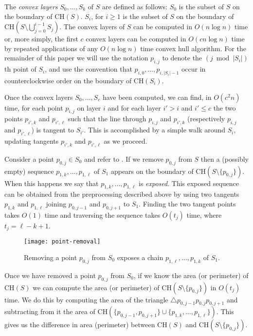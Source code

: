 \documentclass[lotsofwhite]{patmorin}
\newcommand{\ch}{\mathrm{CH}}
\begin{document}
The \emph{convex layers} $S_0,\ldots,S_k$ of $S$ are defined as
follows: $S_0$ is the subset of $S$ on the boundary of $\ch(S)$.
$S_i$, for $i\ge 1$ is the subset of $S$ on the boundary of
$\ch(S\setminus\bigcup_{j=0}^{i-1} S_j)$.  The convex layers of $S$
can be computed in $O(n\log n)$ time \cite{c85,hs92} or, more simply,
the first $c$ convex layers can be computed in $O(cn\log n)$ time by
repeated applications of any $O(n\log n)$ time convex hull algorithm.
For the remainder of this paper we will use the notation $p_{i,j}$ to
denote the $(j\bmod |S_i|)$th point of $S_i$, and use the convention
that $p_{i,0},\ldots,p_{i,|S_i|-1}$ occur in counterclockwise order on
the boundary of $\ch(S_i)$.

Once the convex layers $S_0,\ldots,S_c$ have been computed, we can
find, in $O(c^2 n)$ time, for each point $p_{i,j}$ on layer $i$ and
for each layer $i'> i$ and $i'\le c$ the two points $p_{i',k}$ and
$p_{i',\ell}$ such that the line through $p_{i,j}$ and $p_{i',k}$
(respectively $p_{i,j}$ and $p_{i',\ell}$) is tangent to $S_{i'}$.
This is accomplished by a simple walk around $S_i$, updating tangents
$p_{i',k}$ and $p_{i',\ell}$ as we proceed.

Consider a point $p_{0,j}\in S_0$ and refer to .
If we remove $p_{0,j}$ from $S$ then a (possibly empty) sequence
$p_{1,k},\ldots,p_{1,\ell}$ of $S_1$ appears on the boundary of
$\ch(S\setminus\{p_{0,j}\})$.  When this happens we say that
$p_{1,k},\ldots,p_{1,\ell}$ is \emph{exposed}.  This exposed sequence
can be obtained from the preprocessing described above by using two
tangents $p_{1,k}$ and $p_{1,\ell}$ joining $p_{0,j-1}$ and
$p_{0,j+1}$ to $S_1$.  Finding the two tangent points takes $O(1)$
time and traversing the sequence takes $O(t_j)$ time, where
$t_j=\ell-k+1$.

\begin{figure}
\begin{center}\texttt{[image: point-removal]}\end{center}
\caption{Removing a point $p_{0,j}$ from $S_0$ exposes a chain
$p_{1,\ell},\ldots,p_{1,k}$ of $S_1$.}
\end{figure}

Once we have removed a point $p_{0,j}$ from $S_0$, if we know the area
(or perimeter) of $\ch(S)$ we can compute the area (or perimeter) of
$\ch(S\setminus\{p_{0,j}\})$ in $O(t_j)$ time.  We do this by
computing the area of the triangle $\triangle
p_{0,j-1}p_{0,j}p_{0,j+1}$ and subtracting from it the area of
$\ch(\{p_{0,j-1},p_{0,j+1}\}\cup\{p_{1,k},\ldots,p_{1,\ell}\})$.  This
gives us the difference in area (perimeter) between $\ch(S)$ and
$\ch(S\setminus\{p_{0,j}\})$.
\end{document}
